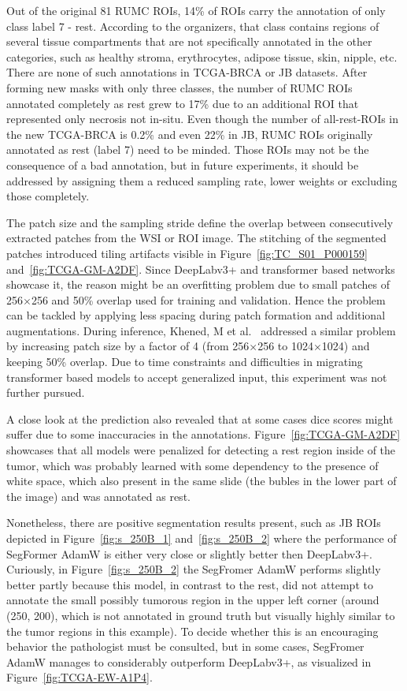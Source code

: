 Out of the original 81 RUMC ROIs, 14\% of ROIs carry the annotation of only class label 7 - rest.
According to the organizers, that class contains regions of several tissue compartments that are not
specifically annotated in the other categories, such as healthy stroma, erythrocytes, adipose tissue,
skin, nipple, etc. There are none of such annotations in TCGA-BRCA or JB datasets.
After forming new masks with only three classes, the number of RUMC ROIs annotated completely as rest grew
to 17\% due to an additional ROI that represented only necrosis not in-situ.
Even though the number of all-rest-ROIs in the new TCGA-BRCA is 0.2\% and even 22\% in JB, RUMC ROIs
originally annotated as rest (label 7) need to be minded.
Those ROIs may not be the consequence of a bad annotation, but in future experiments,
it should be addressed by assigning them a reduced sampling rate, lower weights or excluding those completely. 

The patch size and the sampling stride define the overlap between consecutively extracted
patches from the WSI or ROI image. The stitching of the segmented patches introduced tiling artifacts
visible in Figure~\ref*{fig:TC_S01_P000159} and~\ref*{fig:TCGA-GM-A2DF}.
Since DeepLabv3+ and transformer based networks showcase it, the reason might be an
overfitting problem due to small patches of 256$\times$256 and 50\% overlap used for training and validation.
Hence the problem can be tackled by
applying less spacing during patch formation and additional augmentations.
During inference, Khened, M et al.~\cite*{khened2021generalized} addressed a similar
problem by increasing patch size by a factor of 4 (from 256$\times$256 to 1024$\times$1024)
and keeping 50\% overlap. Due to time constraints and difficulties in migrating transformer based
models to accept generalized input, this experiment was not further pursued.

A close look at the prediction also revealed that at some cases dice scores might suffer due to some inaccuracies
in the annotations. Figure~\ref*{fig:TCGA-GM-A2DF} showcases that all models were
penalized for detecting a rest region inside of the tumor, which was probably learned
with some dependency to the presence of white space, which also present in the same slide
(the bubles in the lower part of the image) and was annotated as rest.

Nonetheless, there are positive segmentation results present, such as JB ROIs depicted in
Figure~\ref*{fig:s_250B_1} and~\ref*{fig:s_250B_2} where the performance of SegFormer AdamW
is either very close or slightly better then DeepLabv3+. 
Curiously, in Figure~\ref*{fig:s_250B_2} the SegFromer AdamW performs slightly better partly
because this model, in contrast to the rest, did not attempt to annotate the small possibly
tumorous region in the upper left corner (around (250, 200), which is not annotated in ground
truth but visually highly similar to the tumor regions in this example). To decide whether
this is an encouraging behavior the pathologist must be consulted, but in some cases,
SegFromer AdamW manages to considerably outperform DeepLabv3+, as visualized in
Figure~\ref*{fig:TCGA-EW-A1P4}.

